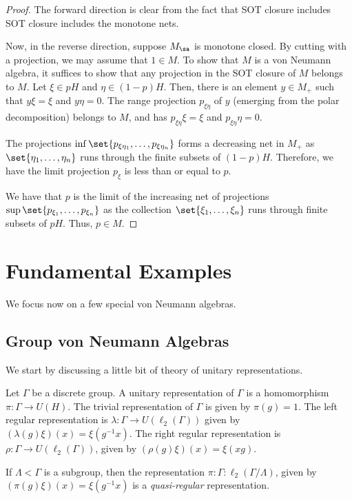 \documentclass[10pt]{mypackage}
\begin{document}
\begin{proof}
  The forward direction is clear from the fact that SOT closure includes SOT closure includes the monotone nets.

  Now, in the reverse direction, suppose $M_{\sa}$ is monotone closed. By cutting with a projection, we may assume that $1\in M$. To show that $M$ is a von Neumann algebra, it suffices to show that any projection in the SOT closure of $M$ belongs to $M$. Let $\xi\in pH$ and $\eta\in \left( 1-p \right)H$. Then, there is an element $y\in M_{+}$ such that $y\xi = \xi$ and $y\eta = 0$. The range projection $p_{\xi\eta}$ of $y$ (emerging from the polar decomposition) belongs to $M$, and has $p_{\xi\eta}\xi = \xi$ and $p_{\xi\eta}\eta = 0$.

  The projections $\inf\set{p_{\xi\eta_1},\dots,p_{\xi\eta_n}}$ forms a decreasing net in $M_{+}$ as $\set{\eta_1,\dots,\eta_n}$ runs through the finite subsets of $\left( 1-p \right)H$. Therefore, we have the limit projection $p_{\xi}$ is less than or equal to $p$.

  We have that $p$ is the limit of the increasing net of projections $\sup\set{p_{\xi_1},\dots,p_{\xi_n}}$ as the collection $\set{\xi_1,\dots,\xi_n}$ runs through finite subsets of $pH$. Thus, $p\in M$.
\end{proof}
\section{Fundamental Examples}%
We focus now on a few special von Neumann algebras.
\subsection{Group von Neumann Algebras}%
We start by discussing a little bit of theory of unitary representations.

Let $\Gamma$ be a discrete group. A unitary representation of $\Gamma$ is a homomorphism $\pi\colon \Gamma\rightarrow U(H)$. The trivial representation of $\Gamma$ is given by $\pi(g) = 1$. The left regular representation is $\lambda\colon \Gamma\rightarrow U\left( \ell_2\left( \Gamma \right) \right)$ given by $\left( \lambda(g)\xi \right)(x) = \xi\left( g^{-1}x \right)$. The right regular representation is $\rho\colon \Gamma\rightarrow U\left( \ell_2\left( \Gamma \right) \right)$, given by $\left( \rho(g)\xi \right)(x) = \xi\left( xg \right)$.

If $\Lambda < \Gamma$ is a subgroup, then the representation $\pi\colon \Gamma\colon \ell_2\left( \Gamma/\Lambda \right)$, given by $\left( \pi(g)\xi \right)(x) = \xi\left( g^{-1}x \right)$ is a \textit{quasi-regular} representation.
\end{document}
